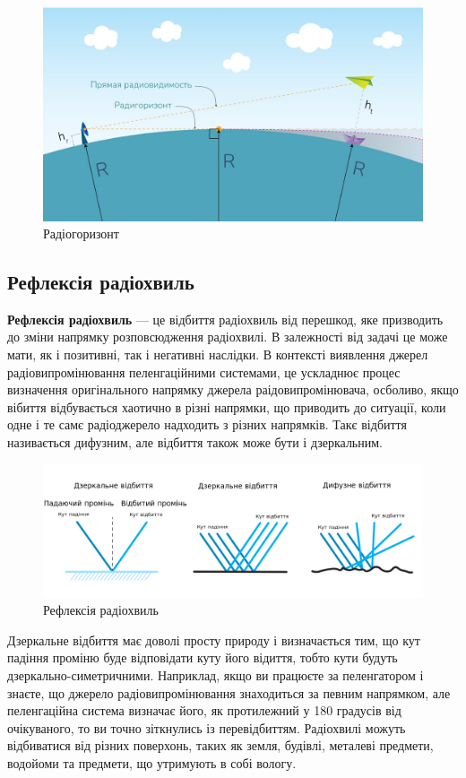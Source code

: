\documentclass{article}
\begin{document}
\begin{figure}[h!]
\centering
\includegraphics[width=0.6\linewidth]{images/radio-horizon.jpeg}
\caption{\label{fig:radio-horizon}Радіогоризонт}
\end{figure}

\subsection{Рефлексія радіохвиль}

\textbf{Рефлексія радіохвиль} --- це відбиття радіохвиль від перешкод, яке призводить до зміни напрямку розповсюдження радіохвилі. В залежності від задачі це може мати, як і позитивні, так і негативні наслідки. В контексті виявлення джерел радіовипромінювання пеленгаційними системами, це ускладнює процес визначення оригінального напрямку джерела раідовипромінювача, осболиво, якщо вібиття відбувається хаотично в різні напрямки, що приводить до ситуації, коли одне і те самє радіоджерело надходить з різних напрямків. Такє відбиття називається дифузним, але відбиття також може бути і дзеркальним. 

\begin{figure}[h!]
	\centering
	\includegraphics[width=0.8\linewidth]{images/reflection.png}
	\caption{\label{fig:reflection}Рефлексія радіохвиль}
\end{figure}

Дзеркальне відбиття має доволі просту природу і визначається тим, що кут падіння проміню буде відповідати куту його відиття, тобто кути будуть дзеркально-симетричними. Наприклад, якщо ви працюєте за пеленгатором і знаєте, що джерело радіовипромінювання знаходиться за певним напрямком, але пеленгаційна система визначає його, як протилежний у 180 градусів від очікуваного, то ви точно зіткнулись із перевідбиттям. Радіохвилі можуть відбиватися від різних поверхонь, таких як земля, будівлі, металеві предмети, водойоми та предмети, що утримують в собі вологу.
\end{document}
